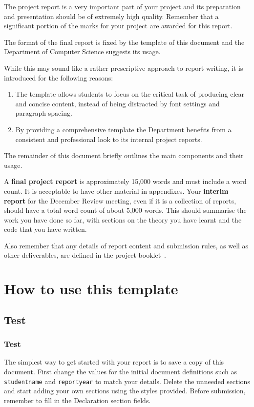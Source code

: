 \documentclass[]{final_report}
\begin{document}
The project report is a very important part of your project and its preparation and presentation should be of extremely high quality. Remember that a significant portion of the marks for your project are awarded for this report. 

The format of the final report is fixed by the template of this document and the Department of Computer Science suggests its usage. 

While this may sound like a rather prescriptive approach to report writing, it is introduced for the following reasons:
\begin{enumerate}
 \item The template allows students to focus on the critical task of producing clear and concise content, instead of being distracted by font settings and paragraph spacing. 
 \item By providing a comprehensive template the Department benefits from a consistent and professional look to its internal project reports.
\end{enumerate}

The remainder of this document briefly outlines the main components and their usage.

A \textbf{final project report} is approximately 15,000 words and must include a word count. It is acceptable to have other material in appendixes.  
Your \textbf{interim report} for the December Review meeting, even if it is a collection of reports, should have a total word count of about 5,000 words. 
This should summarise the work you have done so far, with sections on the theory you have learnt and the code that you have written.

Also remember that any details of report content and submission rules, as well as other deliverables, are defined in the project booklet~.

\section{How to use this template}
\subsection{Test}
\subsubsection{Test}
The simplest way to get started with your report is to save a copy of this document. 
First change the values for the initial document definitions such as \verb|studentname| and \verb|reportyear| to match your details.
Delete the unneeded sections and start adding your own sections using the styles provided.
Before submission, remember to fill in the Declaration section fields.
\end{document}
